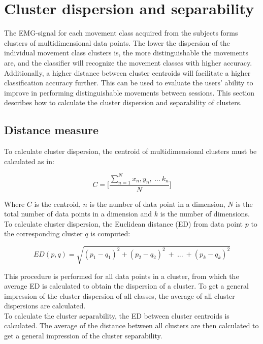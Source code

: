 \section{Cluster dispersion and separability} \label{sec:BG:dataSeparability}
The EMG-signal for each movement class acquired from the subjects forms clusters of multidimensional data points. The lower the dispersion of the individual movement class clusters is, the more distinguishable the movements are, and the classifier will recognize the movement classes with higher accuracy. Additionally, a higher distance between cluster centroids will facilitate a higher classification accuracy further. This can be used to evaluate the users' ability to improve in performing distinguishable movements between sessions. This section describes how to calculate the cluster dispersion and separability of clusters. \\

\subsection{Distance measure} \label{sub:BG:distanceMeasure}
To calculate cluster dispersion, the centroid of multidimensional clusters must be calculated as in:

\begin{equation} \label{eq:centroid}
C = \Bigg[ \frac{\sum\limits_{n=1}^{N}x_{n},y_{n},~...~k_{n}}{N} \Bigg]
\end{equation}

Where $C$ is the centroid, $n$ is the number of data point in a dimension, $N$ is the total number of data points in a dimension and $k$ is the number of dimensions. To calculate cluster dispersion, the Euclidean distance (ED) from data point $p$ to the corresponding cluster $q$ is computed: %

\begin{equation} \label{eq:euclidiandistance}
ED(p,q) = \sqrt{(p_1-q_1)^2 + (p_2-q_2)^2~+~...~+ (p_k-q_k)^2}
\end{equation} 

This procedure is performed for all data points in a cluster, from which the average ED is calculated to obtain the dispersion of a cluster. To get a general impression of the cluster dispersion of all classes, the average of all cluster dispersions are calculated.\\
To calculate the cluster separability, the ED between cluster centroids is calculated. The average of the distance between all clusters are then calculated to get a general impression of the cluster separability.   


